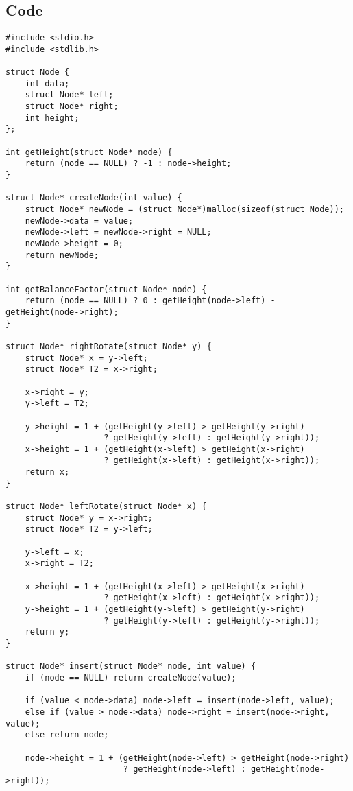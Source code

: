 \documentclass[12pt,a4paper]{article}
\begin{document}
\subsection*{Code}
\begin{lstlisting}
#include <stdio.h>
#include <stdlib.h>

struct Node {
    int data;
    struct Node* left;
    struct Node* right;
    int height;
};

int getHeight(struct Node* node) {
    return (node == NULL) ? -1 : node->height;
}

struct Node* createNode(int value) {
    struct Node* newNode = (struct Node*)malloc(sizeof(struct Node));
    newNode->data = value;
    newNode->left = newNode->right = NULL;
    newNode->height = 0;
    return newNode;
}

int getBalanceFactor(struct Node* node) {
    return (node == NULL) ? 0 : getHeight(node->left) - getHeight(node->right);
}

struct Node* rightRotate(struct Node* y) {
    struct Node* x = y->left;
    struct Node* T2 = x->right;

    x->right = y;
    y->left = T2;

    y->height = 1 + (getHeight(y->left) > getHeight(y->right)
                    ? getHeight(y->left) : getHeight(y->right));
    x->height = 1 + (getHeight(x->left) > getHeight(x->right)
                    ? getHeight(x->left) : getHeight(x->right));
    return x;
}

struct Node* leftRotate(struct Node* x) {
    struct Node* y = x->right;
    struct Node* T2 = y->left;

    y->left = x;
    x->right = T2;

    x->height = 1 + (getHeight(x->left) > getHeight(x->right)
                    ? getHeight(x->left) : getHeight(x->right));
    y->height = 1 + (getHeight(y->left) > getHeight(y->right)
                    ? getHeight(y->left) : getHeight(y->right));
    return y;
}

struct Node* insert(struct Node* node, int value) {
    if (node == NULL) return createNode(value);

    if (value < node->data) node->left = insert(node->left, value);
    else if (value > node->data) node->right = insert(node->right, value);
    else return node;

    node->height = 1 + (getHeight(node->left) > getHeight(node->right)
                        ? getHeight(node->left) : getHeight(node->right));


\end{lstlisting}
\end{document}

